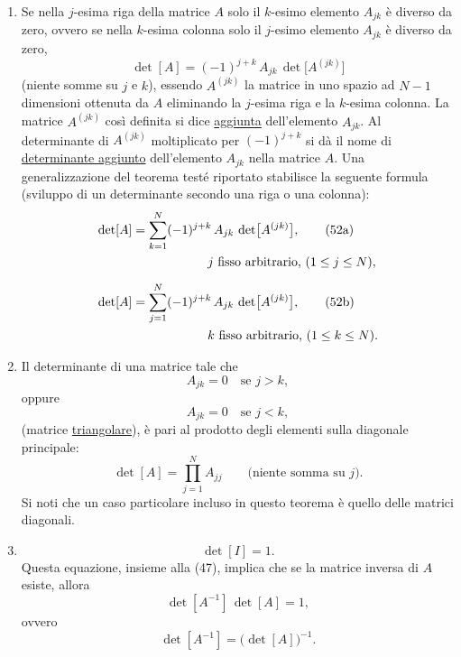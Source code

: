 \documentclass[11pt, a4paper]{book}
\numberwithin{equation}{section}
\begin{document}
\begin{enumerate}
\item Se nella $j$-esima riga della matrice $A$ solo il $k$-esimo elemento $A_{jk}$ è diverso da zero, ovvero se nella $k$-esima colonna solo il $j$-esimo elemento $A_{jk}$ è diverso da zero,
\begin{equation}
    \det[A] = (-1)^{j+k}\, A_{jk}\, \det\bigl[A^{(jk)}\bigr]
    \tag{51}
\end{equation}
(niente somme su $j$ e $k$), essendo $A^{(jk)}$ la matrice in uno spazio ad $N-1$ dimensioni ottenuta da $A$ eliminando la $j$-esima riga e la $k$-esima colonna. La matrice $A^{(jk)}$ così definita si dice \uline{aggiunta} dell'elemento $A_{jk}$. Al determinante di $A^{(jk)}$ moltiplicato per $(-1)^{j+k}$ si dà il nome di \uline{determinante aggiunto} dell'elemento $A_{jk}$ nella matrice $A$. Una generalizzazione del teorema testé riportato stabilisce la seguente formula (sviluppo di un determinante secondo una riga o una colonna):
\begin{align}
    \det[A] &= \sum_{k=1}^{N} (-1)^{j+k}\, A_{jk}\, \det\bigl[A^{(jk)}\bigr],
    \tag{52a} \\
    &\hspace{6em} j \text{ fisso arbitrario, } (1 \leq j \leq N), \notag \\[6pt]
    \det[A] &= \sum_{j=1}^{N} (-1)^{j+k}\, A_{jk}\, \det\bigl[A^{(jk)}\bigr],
    \tag{52b} \\
    &\hspace{6em} k \text{ fisso arbitrario, } (1 \leq k \leq N). \notag
\end{align}

\item Il determinante di una matrice tale che
\begin{equation}
    A_{jk} = 0 \quad \text{se } j > k,
    \tag{53a}
\end{equation}
oppure
\begin{equation}
    A_{jk} = 0 \quad \text{se } j < k,
    \tag{53b}
\end{equation}
(matrice \uline{triangolare}), è pari al prodotto degli elementi sulla diagonale principale:
\begin{equation}
    \det[A] = \prod_{j=1}^{N} A_{jj} \qquad \text{(niente somma su } j\text{)}.
    \tag{54}
\end{equation}
Si noti che un caso particolare incluso in questo teorema è quello delle matrici diagonali.

\item
\begin{equation}
    \det[I] = 1.
    \tag{55}
\end{equation}
Questa equazione, insieme alla (47), implica che se la matrice inversa di $A$ esiste, allora
\begin{equation}
    \det[A^{-1}]\, \det[A] = 1,
    \tag{56a}
\end{equation}
ovvero
\begin{equation}
    \det[A^{-1}] = \bigl(\det[A]\bigr)^{-1}.
    \tag{56b}
\end{equation}


\end{enumerate}
\end{document}

